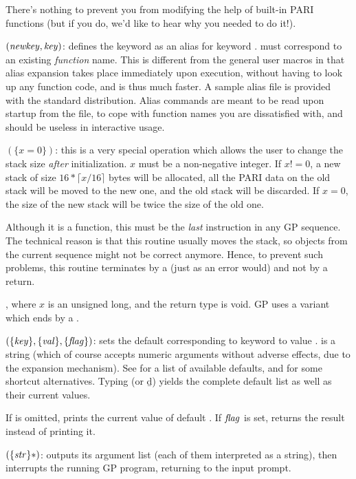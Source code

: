 There's nothing to prevent you from modifying the help of built-in PARI
functions (but if you do, we'd like to hear why you needed to do it!).

$(\hbox{\it newkey\/},\hbox{\it key\/})$: defines the keyword
 as an alias for keyword .  must correspond
to an existing \emph{function} name. This is different from the general user
macros in that alias expansion takes place immediately upon execution,
without having to look up any function code, and is thus much faster. A
sample alias file  is provided with the standard
distribution. Alias commands are meant to be read upon startup from the
 file, to cope with function names you are dissatisfied with, and
should be useless in interactive usage.

$(\{x=0\})$: this is a very special operation which
allows the user to change the stack size \emph{after} initialization. $x$
must be a non-negative integer. If $x!=0$, a new stack of size $16*\lceil
x/16\rceil$ bytes will be allocated, all the PARI data on the old stack will
be moved to the new one, and the old stack will be discarded. If $x=0$, the
size of the new stack will be twice the size of the old one.

Although it is a function, this must be the \emph{last} instruction in any GP
sequence. The technical reason is that this routine usually moves the stack,
so objects from the current sequence might not be correct anymore. Hence, to
prevent such problems, this routine terminates by a  (just as an
error would) and not by a return.

, where $x$ is an unsigned long, and the return type
is void. GP uses a variant which ends by a .

$(\{\hbox{\it key\/}\},\{\hbox{\it val\/}\},\{\hbox{\it f\kern0pt lag\/}\})$: sets the default
corresponding to keyword  to value .  is a string
(which of course accepts numeric arguments without adverse effects, due to the
expansion mechanism). See  for a list of available
defaults, and  for some shortcut alternatives. Typing
 (or \b{d}) yields the complete default list as well as
their current values.\label{se:default}

If  is omitted, prints the current value of default .
If $\hbox{\it f\kern0pt lag\/}$ is set, returns the result instead of printing it.

$(\{\hbox{\it str\/}\}*)$: outputs its argument list (each of
them interpreted as a string), then interrupts the running GP program,
returning to the input prompt.


